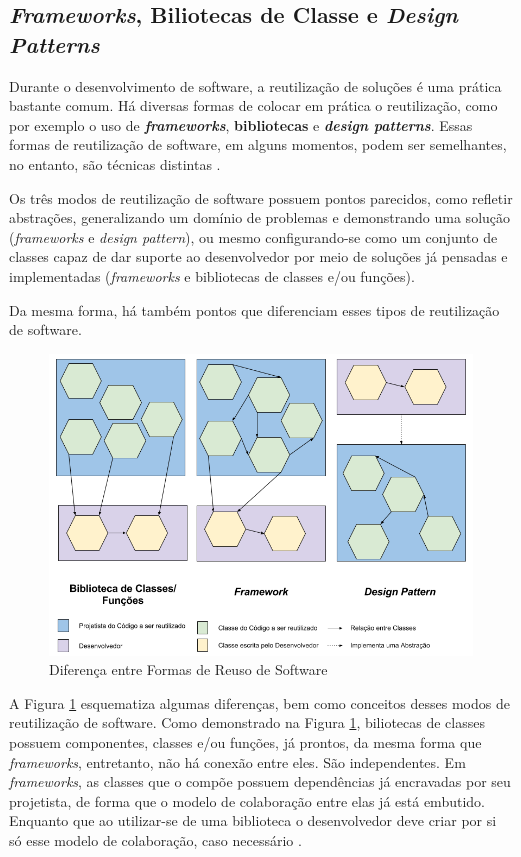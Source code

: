 \subsection{\textit{Frameworks}, Biliotecas de Classe e \textit{Design Patterns}}
Durante o desenvolvimento de software, a reutilização de soluções é uma prática bastante comum. Há diversas formas de colocar em prática o reutilização, como por exemplo o uso de \textbf{\textit{frameworks}}, \textbf{bibliotecas} e \textbf{\textit{design patterns}}. Essas formas de reutilização de software, em alguns momentos, podem ser semelhantes, no entanto, são técnicas distintas \cite{barretoJunior2006}.
\par
\indent Os três modos de reutilização de software possuem pontos parecidos, como refletir abstrações, generalizando um domínio de problemas e demonstrando uma solução (\textit{frameworks} e \textit{design pattern}), ou mesmo configurando-se como um conjunto de classes capaz de dar suporte ao desenvolvedor por meio de soluções já pensadas e implementadas (\textit{frameworks} e bibliotecas de classes e/ou funções).
\par
\indent Da mesma forma, há também pontos que diferenciam esses tipos de reutilização de software.
  \begin{figure}[h]
    \centering
    \includegraphics[width=\textwidth]{figuras/bibFrameworkDesignPattern.png}
    \caption{Diferença entre Formas de Reuso de Software}
    \label{fig:bibFrameworkPattern}
  \end{figure}
\par
\indent A Figura \ref{fig:bibFrameworkPattern} esquematiza algumas diferenças, bem como conceitos desses modos de reutilização de software. Como demonstrado na Figura \ref{fig:bibFrameworkPattern}, biliotecas de classes possuem componentes, classes e/ou funções, já prontos, da mesma forma que \textit{frameworks}, entretanto, não há conexão entre eles. São independentes. Em \textit{frameworks}, as classes que o compõe possuem dependências já encravadas por seu projetista, de forma que o modelo de colaboração entre elas já está embutido. Enquanto que ao utilizar-se de uma biblioteca o desenvolvedor deve criar por si só esse modelo de colaboração, caso necessário \cite{barretoJunior2006}.
